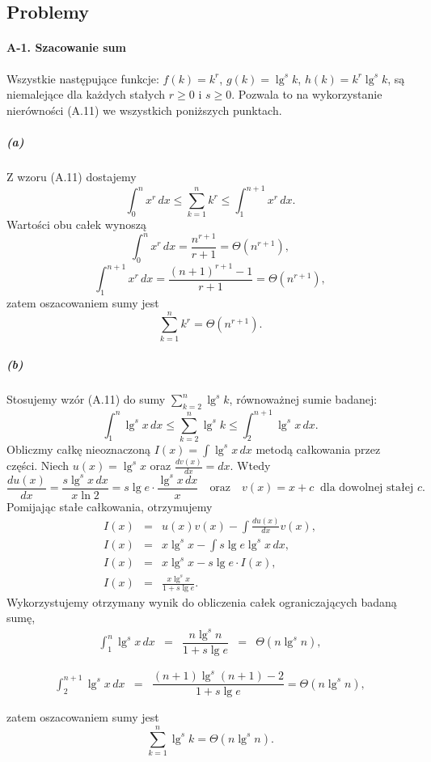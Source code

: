 \subsection*{Problemy}

\paragraph{A-1. Szacowanie sum}
Wszystkie następujące funkcje: $f(k)=k^r$, $g(k)=\lg^sk$, $h(k)=k^r\lg^sk$, są niemalejące dla każdych stałych $r\ge 0$ i $s\ge 0$. Pozwala to na wykorzystanie nierówności (A.11) we wszystkich poniższych punktach.

\subparagraph{(a)}
Z wzoru (A.11) dostajemy
\[
	\int_0^nx^r\,dx\le\sum_{k=1}^nk^r\le\int_1^{n+1}x^r\,dx.
\]
Wartości obu całek wynoszą
\[
	\int_0^nx^r\,dx = \frac{n^{r+1}}{r+1} = \Theta(n^{r+1}),
\]
\[
	\int_1^{n+1}x^r\,dx = \frac{(n+1)^{r+1}-1}{r+1} = \Theta(n^{r+1}),
\]
zatem oszacowaniem sumy jest
\[
	\sum_{k=1}^nk^r = \Theta(n^{r+1}).
\]

\subparagraph{(b)}
Stosujemy wzór (A.11) do sumy $\sum_{k=2}^n\lg^sk$, równoważnej sumie badanej:
\[
	\int_1^n\lg^sx\,dx\le\sum_{k=2}^n\lg^sk\le\int_2^{n+1}\lg^sx\,dx.
\]
Obliczmy całkę nieoznaczoną $I(x) = \int\lg^sx\,dx$ metodą całkowania przez części. Niech $u(x)=\lg^sx$ oraz $\frac{dv(x)}{dx}=dx$. Wtedy
\[
	\frac{du(x)}{dx} = \frac{s\lg^sx\,dx}{x\ln 2} = s\lg e\cdot\frac{\lg^sx\,dx}{x}\quad\mbox{oraz}\quad v(x)=x+c\;\;\mbox{dla dowolnej stałej }c.
\]
Pomijając stałe całkowania, otrzymujemy
\begin{eqnarray*}
	I(x) &=& u(x)v(x)-\int\frac{du(x)}{dx}v(x), \\
	I(x) &=& x\lg^sx-\int s\lg e\lg^sx\,dx, \\
	I(x) &=& x\lg^sx-s\lg e\cdot I(x), \\
	I(x) &=& \frac{x\lg^sx}{1+s\lg e}.
\end{eqnarray*}
Wykorzystujemy otrzymany wynik do obliczenia całek ograniczających badaną sumę,
\[
	\begin{array}{ccccc}
		{\displaystyle \int_1^n\lg^sx\,dx} &=& \dfrac{n\lg^sn}{1+s\lg e} &=& \Theta(n\lg^sn), \\\\
	\end{array}
\]
\[
	\begin{array}{ccccc}
		{\displaystyle \int_2^{n+1}\lg^sx\,dx} &=& \dfrac{(n+1)\lg^s(n+1)-2}{1+s\lg e} = \Theta(n\lg^sn), \\\\
	\end{array}
\]
zatem oszacowaniem sumy jest
\[
	\sum_{k=1}^n\lg^sk = \Theta(n\lg^sn).
\]

